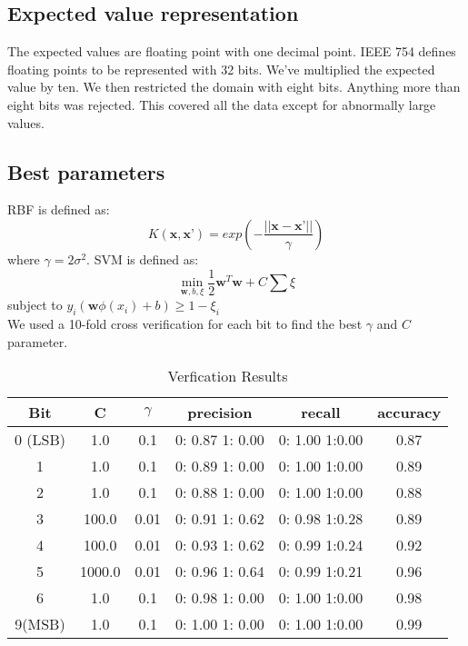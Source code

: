 \documentclass[pdftex,a4paper,12pt]{article}
\begin{document}
\subsection{Expected value representation}
The expected values are floating point with one decimal point.  IEEE 754 defines floating points to be represented with 32 bits.  We've multiplied the expected value by ten.  We then restricted the domain with eight bits.  Anything more than eight bits was rejected.  This covered all the data except for abnormally large values.
 \subsection{Best parameters}
 RBF is defined as: 
$$K(\textbf{x},\textbf{x'}) = exp(-\frac{||\textbf{x} - \textbf{x'} ||}{\gamma} )$$ where $\gamma = 2\sigma^2$\cite{vert2004primer}.  SVM is defined as:
\begin{equation}
\mathop{min}_{\textbf{w}, b, \textbf{$\xi$} } \frac{1}{2} \textbf{w}^T\textbf{w} + C\sum {\xi}
\end{equation}
subject to $y_i(\textbf{w}\phi(x_i) + b) \geq 1 - \xi_i$ \cite{LIBSVM}\\
We used a 10-fold cross verification for each bit to find the best $\gamma$ and $C$ parameter.

\begin{table}[h]
{\centering
\begin{tabular}{|c|c|c|c|c|c|} \hline
	Bit 		&			C			&			$\gamma$		&		precision			&		recall				&		accuracy			\\	\hline
0 (LSB)		&			1.0		&			0.1					&	0: 0.87	1: 0.00	&	0: 1.00	1:0.00	&			0.87				\\	\hline
1 				&			1.0		&			0.1					&	0: 0.89	1: 0.00	&	0: 1.00	1:0.00	&			0.89				\\	\hline
2 				&			1.0		&			0.1					&	0: 0.88	1: 0.00	&	0: 1.00	1:0.00	&			0.88				\\	\hline
3 				&			100.0		&		0.01				&	0: 0.91	1: 0.62	&	0: 0.98	1:0.28	&			0.89				\\	\hline
4 				&			100.0		&		0.01				&	0: 0.93	1: 0.62	&	0: 0.99	1:0.24	&			0.92				\\	\hline
5 				&			1000.0	&		0.01				&	0: 0.96	1: 0.64	&	0: 0.99	1:0.21	&			0.96				\\	\hline
6 				&			1.0		&			0.1					&	0: 0.98	1: 0.00	&	0: 1.00	1:0.00	&			0.98				\\	\hline
9(MSB) 		&			1.0		&			0.1					&	0: 1.00	1: 0.00	&	0: 1.00	1:0.00	&			0.99				\\	\hline
\end{tabular}
\caption{Verfication Results}          
\label{table:verfresults}}
\end{table}




\end{document}
